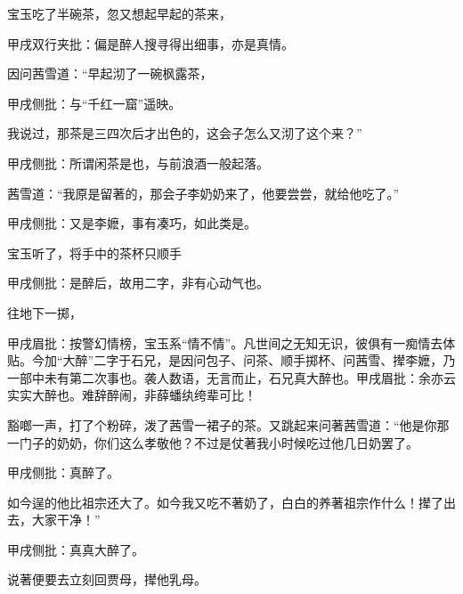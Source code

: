 \begin{parag}
    宝玉吃了半碗茶，忽又想起早起的茶来，\begin{note}甲戌双行夹批：偏是醉人搜寻得出细事，亦是真情。\end{note}因问茜雪道：“早起沏了一碗枫露茶，\begin{note}甲戌侧批：与“千红一窟”遥映。\end{note}我说过，那茶是三四次后才出色的，这会子怎么又沏了这个来？”\begin{note}甲戌侧批：所谓闲茶是也，与前浪酒一般起落。\end{note}茜雪道：“我原是留著的，那会子李奶奶来了，他要尝尝，就给他吃了。”\begin{note}甲戌侧批：又是李嬷，事有凑巧，如此类是。\end{note}宝玉听了，将手中的茶杯只顺手\begin{note}甲戌侧批：是醉后，故用二字，非有心动气也。\end{note}往地下一掷，\begin{note}甲戌眉批：按警幻情榜，宝玉系“情不情”。凡世间之无知无识，彼俱有一痴情去体贴。今加“大醉”二字于石兄，是因问包子、问茶、顺手掷杯、问茜雪、撵李嬷，乃一部中未有第二次事也。袭人数语，无言而止，石兄真大醉也。甲戌眉批：余亦云实实大醉也。难辞醉闹，非薛蟠纨绔辈可比！\end{note}豁啷一声，打了个粉碎，泼了茜雪一裙子的茶。又跳起来问著茜雪道：“他是你那一门子的奶奶，你们这么孝敬他？不过是仗著我小时候吃过他几日奶罢了。\begin{note}甲戌侧批：真醉了。\end{note}如今逞的他比祖宗还大了。如今我又吃不著奶了，白白的养著祖宗作什么！撵了出去，大家干净！”\begin{note}甲戌侧批：真真大醉了。\end{note}说著便要去立刻回贾母，撵他乳母。
\end{parag}


